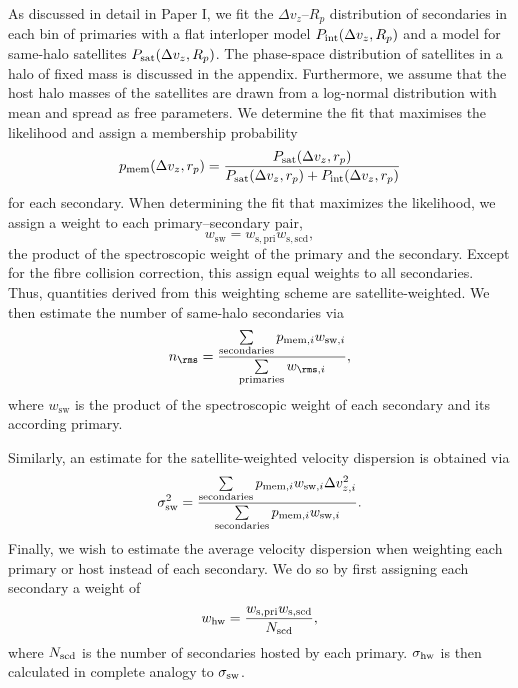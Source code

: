 \documentclass[fleqn,usenatbib,useAMS]{mnras}
\begin{document}
As discussed in detail in Paper I, we fit the $\Delta v_z$--$R_p$ distribution of secondaries in each bin of primaries with a flat interloper model $P_{\rm int} (\Delta v_z, R_p)$ and a model for same-halo satellites $P_{\rm sat} (\Delta v_z, R_p)$. The phase-space distribution of satellites in a halo of fixed mass is discussed in the appendix. Furthermore, we assume that the host halo masses of the satellites are drawn from a log-normal distribution with mean and spread as free parameters. We determine the fit that maximises the likelihood and assign a membership probability
\begin{equation}
	p_{\rm mem} (\Delta v_z, r_p) = \frac{P_{\rm sat} (\Delta v_z, r_p)}{P_{\rm sat} (\Delta v_z, r_p) + P_{\rm int} (\Delta v_z, r_p)}
\end{equation}
for each secondary. When determining the fit that maximizes the likelihood, we assign a weight to each primary--secondary pair,
\begin{equation}
	w_{\mathrm{sw}} = w_{\mathrm{s, pri}} w_{\mathrm{s, scd}},
\end{equation}
the product of the spectroscopic weight of the primary and the secondary. Except for the fibre collision correction, this assign equal weights to all secondaries. Thus, quantities derived from this weighting scheme are satellite-weighted. We then estimate the number of same-halo secondaries via
\begin{equation}
	n_\rms = \frac{\sum\limits_{\rm secondaries} p_{\mathrm{mem}, i} w_{\mathrm{sw}, i}}{\sum\limits_{\rm primaries} w_{\rms, i}},
\end{equation}
where $w_{\mathrm{sw}}$ is the product of the spectroscopic weight of each secondary and its according primary.

Similarly, an estimate for the satellite-weighted velocity dispersion is obtained via
\begin{equation}
	\sigma_{\rm sw}^2 = \frac{\sum\limits_{\rm secondaries} p_{\mathrm{mem}, i} w_{\mathrm{sw}, i} \Delta v_{z, i}^2}{\sum\limits_{\rm secondaries} p_{\mathrm{mem}, i} w_{\mathrm{sw}, i}}.
\label{eq:sigma_sw}
\end{equation}
Finally, we wish to estimate the average velocity dispersion when weighting each primary or host instead of each secondary. We do so by first assigning each secondary a weight of
\begin{equation}
	w_{\mathrm{hw}} = \frac{w_{\mathrm{s, pri}} w_{\mathrm{s, scd}}}{N_{\rm scd}},
\end{equation}
where $N_{\rm scd}$ is the number of secondaries hosted by each primary. $\sigma_{\rm hw}$ is then calculated in complete analogy to $\sigma_{\rm sw}$.
\end{document}
